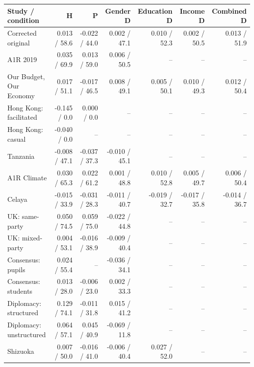 
\begin{tabular}{lrrrrrr}
\toprule
Study / condition & H & P & Gender D & Education D & Income D & Combined D\\
\midrule
Corrected original & 0.013 / 58.6 & -0.022 / 44.0 & 0.002 / 47.1 & 0.010 / 52.3 & 0.002 / 50.5 & 0.013 / 51.9\\
A1R 2019 & 0.035 / 69.9 & 0.013 / 59.0 & 0.006 / 50.5 & -- & -- & --\\
Our Budget, Our Economy & 0.017 / 51.1 & -0.017 / 46.5 & 0.008 / 49.1 & 0.005 / 50.1 & 0.010 / 49.3 & 0.012 / 50.4\\
Hong Kong: facilitated & -0.145 / 0.0 & 0.000 / 0.0 & -- & -- & -- & --\\
Hong Kong: casual & -0.040 / 0.0 & -- & -- & -- & -- & --\\
\addlinespace
Tanzania & -0.008 / 47.1 & -0.037 / 37.3 & -0.010 / 45.1 & -- & -- & --\\
A1R Climate & 0.030 / 65.3 & 0.022 / 61.2 & 0.001 / 48.8 & 0.010 / 52.8 & 0.005 / 49.7 & 0.006 / 50.4\\
Celaya & -0.015 / 33.9 & -0.031 / 28.3 & -0.011 / 40.7 & -0.019 / 32.7 & -0.017 / 35.8 & -0.014 / 36.7\\
UK: same-party & 0.050 / 74.5 & 0.059 / 75.0 & -0.022 / 44.8 & -- & -- & --\\
UK: mixed-party & 0.004 / 53.1 & -0.016 / 38.9 & -0.009 / 40.4 & -- & -- & --\\
\addlinespace
Consensus: pupils & 0.024 / 55.4 & -- & -0.036 / 34.1 & -- & -- & --\\
Consensus: students & 0.013 / 28.0 & -0.006 / 23.0 & 0.002 / 33.3 & -- & -- & --\\
Diplomacy: structured & 0.129 / 74.1 & -0.011 / 31.8 & 0.015 / 41.2 & -- & -- & --\\
Diplomacy: unstructured & 0.064 / 57.1 & 0.045 / 40.9 & -0.069 / 11.8 & -- & -- & --\\
Shizuoka & 0.007 / 50.0 & -0.016 / 41.0 & -0.006 / 40.4 & 0.027 / 52.0 & -- & --\\
\bottomrule
\end{tabular}
